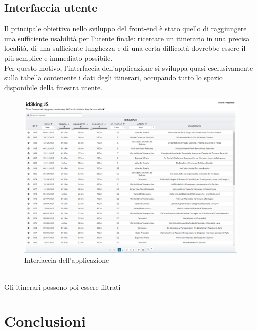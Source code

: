\documentclass[11pt]{report}
\begin{document}
\subsection{Interfaccia utente}
Il principale obiettivo nello sviluppo del front-end è stato quello di raggiungere una sufficiente usabilità per l'utente finale: ricercare un itinerario in una precisa località, di una sufficiente lunghezza e di una certa difficoltà dovrebbe essere il più semplice e immediato possibile.
\\Per questo motivo, l'interfaccia dell'applicazione si sviluppa quasi esclusivamente sulla tabella contenente i dati degli itinerari, occupando tutto lo spazio disponibile della finestra utente.
\begin{figure}[h]
	\centering
	\includegraphics[scale=0.38]{ui_1.png}
	\caption{Interfaccia dell'applicazione \label{ui_1}}
\end{figure}
\\Gli itinerari possono poi essere filtrati
\pagebreak
\section{Conclusioni}
\end{document}
